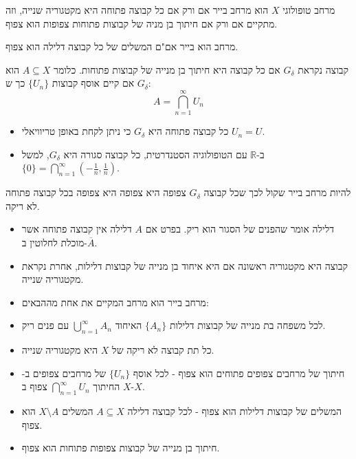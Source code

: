 \documentclass{tstextbook}
\begin{document}
\begin{proposition}
מרחב טופולוגי \(X\) הוא מרחב בייר אם ורק אם כל קבוצה פתוחה היא מקטגוריה שנייה, וזה מתקיים אם ורק אם חיתוך בן מניה של קבוצות פתוחות צפופות הוא צפוף.

\end{proposition}
\begin{corollary}
מרחב הוא בייר אם"ם המשלים של כל קבוצה דלילה הוא צפוף.

\end{corollary}
\begin{definition}
קבוצה נקראת \(G_{\delta}\) אם כל קבוצה היא חיתוך בן מנייה של קבוצות פתוחות. כלומר \(A\subseteq X\) הוא \(G_{\delta}\) אם קיים אוסף קבוצות \(\{ U_{n} \}\) כך ש:
$$A=\bigcap_{n=1}^{\infty} U_{n}$$

\end{definition}
\begin{example}
  \begin{itemize}
    \item כל קבוצה פתוחה היא \(G_{\delta}\) כי ניתן לקחת באופן טריוויאלי \(U_{n}=U\).
    \item ב-\(\mathbb{R}\) עם הטופולוגיה הסטנדרטית, כל קבוצה סגורה היא \(G_{\delta}\), למשל \(\{ 0 \}=\bigcap_{n=1}^{\infty}\left( -\frac{1}{n},\frac{1}{n} \right)\).
  \end{itemize}
\end{example}
\begin{corollary}
להיות מרחב בייר שקול לכך שכל קבוצה \(G_{\delta}\) צפופה היא צפופה היא צפופה בכל קבוצה פתוחה לא ריקה. 

\end{corollary}
\begin{summary}
  \begin{itemize}
    \item דלילה אומר שהפנים של הסגור הוא ריק. בפרט אם \(A\) דלילה אין קבוצה פתוחה אשר מוכלת לחלוטין ב-\(\overline{A}\).
    \item קבוצה היא מקטגוריה ראשונה אם היא איחוד בן מנייה של קבוצות דלילות, אחרת נקראת מקטגוריה שנייה.
    \item מרחב בייר הוא מרחב המקיים את אחת מההבאים:


    \item לכל משפחה בת מנייה של קבוצות דלילות \(\{ A_{n} \}\) האיחוד \(\bigcup_{n=1}^{\infty}A_{n}\) עם פנים ריק. 


    \item כל תת קבוצה לא ריקה של \(X\) היא מקטגוריה שנייה. 


    \item חיתוך של מרחבים צפופים פתוחים הוא צפוף - לכל אוסף \(\{ U_{n} \}\) של מרחבים צפופים ב-\(X\) החיתוך \(\bigcap_{n=1}^{\infty}U_{n}\) צפוף ב-\(X\). 


    \item המשלים של קבוצות דלילות הוא צפוף - לכל קבוצה דלילה \(A\subseteq X\) המשלים \(X \setminus A\) הוא צפוף. 


    \item חיתוך בן מנייה של קבוצות צפופות פתוחות הוא צפוף. 


  \end{itemize}
\end{summary}
\end{document}
